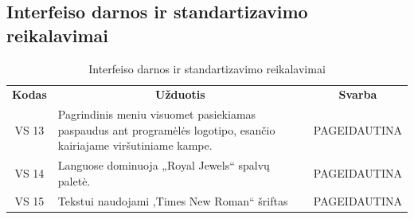 \documentclass{VUMIFPSkursinis}
\begin{document}
\subsection{Interfeiso darnos ir standartizavimo reikalavimai}
\begin{center}
	\begin{table}[H]
	\caption{Interfeiso darnos ir standartizavimo reikalavimai}
	\begin{tabular}{|p{2cm}|p{14cm}|p{2cm}|}
	\hline
	    \rowcolor{lightgray}
	    \multicolumn{3}{|c|}{Interfeiso darnos ir standartizavimo reikalavimai}\\
	\hline
		\multicolumn{1}{|c|}{{\bfseries Kodas}}&
		\multicolumn{1}{|c|}{ {\bfseries Užduotis}}&
		\multicolumn{1}{|c|}{{\bfseries Svarba}}\\		
	\hline
		\multicolumn{1}{|c|}{VS 13}&
		\multicolumn{1}{|p{12,9cm}|}{Pagrindinis meniu visuomet pasiekiamas paspaudus ant programėlės logotipo, esančio kairiajame viršutiniame kampe.}& 
		\multicolumn{1}{|p{1.5cm}|}{PAGEIDAUTINA}\\
	\hline
		\multicolumn{1}{|c|}{VS 14}&
		\multicolumn{1}{|p{12cm}|}{Languose dominuoja „Royal Jewels“ spalvų paletė.}& 
		\multicolumn{1}{|p{1.5cm}|}{PAGEIDAUTINA}\\
	\hline
		\multicolumn{1}{|c|}{VS 15}&
		\multicolumn{1}{|p{12cm}|}{Tekstui naudojami ‚Times New Roman“ šriftas}& 
		\multicolumn{1}{|p{1.5cm}|}{PAGEIDAUTINA}\\
	\hline  	 	
	
	\end{tabular}
	
	\label{table:4}
	\end{table}

\end{center}
\end{document}

